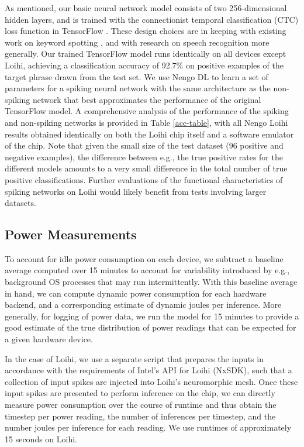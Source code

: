 \documentclass{article}
\begin{document}
As mentioned, our basic neural network model consists of two 256-dimensional hidden layers, and is trained with the connectionist temporal classification (CTC) loss function \cite{Graves:2006} in TensorFlow \cite{Abadi:2016}. These design choices are in keeping with existing work on keyword spotting \cite{Chen:2014}, and with research on speech recognition more generally. Our trained TensorFlow model runs identically on all devices except Loihi, achieving a classification accuracy of 92.7\% on positive examples of the target phrase drawn from the test set. We use Nengo DL \citep{Rasmussen:2018} to learn a set of parameters for a spiking neural network with the same architecture as the non-spiking network that best approximates the performance of the original TensorFlow model. A comprehensive analysis of the performance of the spiking and non-spiking networks is provided in Table \ref{acc-table}, with all Nengo Loihi results obtained identically on both the Loihi chip itself and a software emulator of the chip. Note that given the small size of the test dataset (96 positive and negative examples), the difference between e.g., the true positive rates for the different models amounts to a very small difference in the total number of true positive classifications. Further evaluations of the functional characteristics of spiking networks on Loihi would likely benefit from tests involving larger datasets. 

\subsection{Power Measurements}

To account for idle power consumption on each device, we subtract a baseline average computed over 15 minutes to account for variability introduced by e.g., background OS processes that may run intermittently. With this baseline average in hand, we can compute dynamic power consumption for each hardware backend, and a corresponding estimate of dynamic joules per inference. More generally, for logging of power data, we run the model for 15 minutes to provide a good estimate of the true distribution of power readings that can be expected for a given hardware device.

In the case of Loihi, we use a separate script that prepares the inputs in accordance with the requirements of Intel's API for Loihi (NxSDK), such that a collection of input spikes are injected into Loihi's neuromorphic mesh. Once these input spikes are presented to perform inference on the chip, we can directly measure power consumption over the course of runtime and thus obtain the timestep per power reading, the number of inferences per timestep, and the number joules per inference for each reading. We use runtimes of approximately 15 seconds on Loihi.
\end{document}
